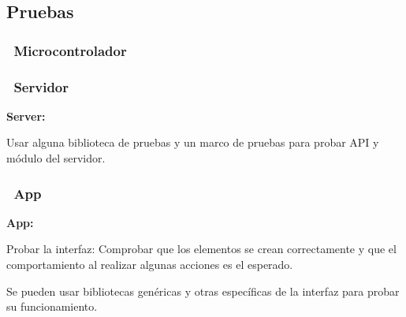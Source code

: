 \documentclass[compress, aspectratio=169]{beamer} %
\begin{document}
\subsection{Pruebas}
\begin{frame}
  \transdissolve[duration=1]
  \frametitle{\insertsubsection}
\end{frame}

\begin{frame}
  \transdissolve[duration=1]
  \frametitle{\insertsubsection\ Microcontrolador}


  

\end{frame}

\begin{frame}
  \transdissolve[duration=1]
  \frametitle{\insertsubsection\ Servidor}
  \textbf{Server:}

  Usar alguna biblioteca de pruebas y un marco de pruebas para probar
  API y módulo del servidor.
\end{frame}

\begin{frame}
  \transdissolve[duration=1]
  \frametitle{\insertsubsection\ App}
  \textbf{App:}

  Probar la interfaz: Comprobar que los elementos se crean
  correctamente y que el comportamiento al realizar algunas acciones
  es el esperado.

  Se pueden usar bibliotecas genéricas y otras específicas de la
  interfaz para probar su funcionamiento.
\end{frame}
\end{document}
